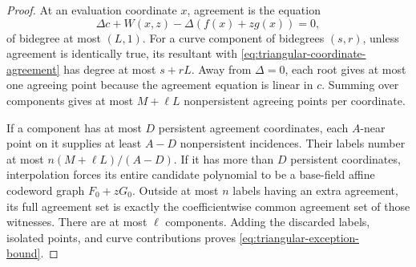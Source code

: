 \begin{proof}
At an evaluation coordinate $x$, agreement is the equation
\begin{equation}\label{eq:triangular-coordinate-agreement}
 \Delta c+W(x,z)-\Delta(f(x)+zg(x))=0,
\end{equation}
of bidegree at most $(L,1)$. For a curve component of bidegrees $(s,r)$,
unless agreement is identically true, its resultant with
\eqref{eq:triangular-coordinate-agreement} has degree at most $s+rL$.
Away from $\Delta=0$, each root gives at most one agreeing point because
the agreement equation is linear in $c$. Summing over components gives
at most $M+\ell L$ nonpersistent agreeing points per coordinate.

If a component has at most $D$ persistent agreement coordinates, each
$A$-near point on it supplies at least $A-D$ nonpersistent incidences.
Their labels number at most $n(M+\ell L)/(A-D)$. If it has more than $D$
persistent coordinates, interpolation forces its entire candidate
polynomial to be a base-field affine codeword graph $F_0+zG_0$.
Outside at most $n$ labels having an extra agreement, its full agreement
set is exactly the coefficientwise common agreement set of those
witnesses. There are at most $\ell$ components. Adding the discarded
labels, isolated points, and curve contributions proves
\eqref{eq:triangular-exception-bound}.
\end{proof}

